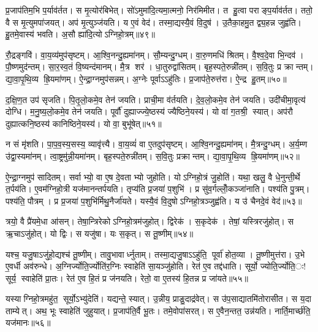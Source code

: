 प्र॒जाप॑तिम॒भि प॒र्याव॑र्तत। स मृ॒त्योर॑बिभेत्। सो॑ऽमुमा॑दि॒त्यमा॒त्मनो॒ निर॑मिमीत। त हु॒त्वा पराङ्प॒र्याव॑र्तत। ततो॒ वै स मृ॒त्युमपा॑जयत्। अप॑ मृ॒त्युञ्ज॑यति। य ए॒वं वेद॑। तस्मा॒द्यस्यै॒वं वि॒दुष॑। उ॒तैका॒हमु॒त द्व्य॒हन्न जुह्व॑ति। हु॒तमे॒वास्य॑ भवति। अ॒सौ ह्या॑दि॒त्योऽग्निहो॒त्रम्॥४९॥\anuvakamend[त॒नुवै॑ वा॒युर॒ग्निर्भ॑व॒त्यवि॑त्वा भव॒त्येकं च]

रौ॒द्रङ्गवि॑। वा॒य॒व्य॑मुप॑सृष्टम्। आ॒श्वि॒नन्दु॒ह्यमा॑नम्। सौ॒म्यन्दु॒ग्धम्। वा॒रु॒णमधि॑ श्रितम्। वै॒श्व॒दे॒वा भि॒न्दव॑। पौ॒ष्णमुद॑न्तम्। सा॒र॒स्व॒तं वि॒ष्यन्द॑मानम्। मै॒त्र शर॑। धा॒तुरुद्वा॑सितम्। बृह॒स्पते॒रुन्नी॑तम्। स॒वि॒तुः प्र क्रान्तम्। द्या॒वा॒पृ॒थि॒व्य ह्रि॒यमा॑णम्। ऐ॒न्द्रा॒ग्नमुप॑सन्नम्। अ॒ग्नेः पूर्वाऽऽहु॑तिः। प्र॒जाप॑ते॒रुत्त॑रा। ऐ॒न्द्र हु॒तम्॥५०॥\anuvakamend[उद्वा॑सित स॒प्त च॑]

द॒क्षि॒ण॒त उप॑ सृजति। पि॒तृ॒लो॒कमे॒व तेन॑ जयति। प्राची॒मा व॑र्तयति। दे॒व॒लो॒कमे॒व तेन॑ जयति। उदी॑चीमा॒वृत्य॑ दोग्धि। म॒नु॒ष्य॒लो॒कमे॒व तेन॑ जयति। पूर्वौ॑ दुह्याज्ज्ये॒ष्ठस्य॑ ज्यैष्ठिने॒यस्य॑। यो वा॑ ग॒तश्री॒ स्यात्। अप॑रौ दुह्यात्कनि॒ष्ठस्य॑ कानिष्ठिने॒यस्य॑। यो वा॒ बुभू॑षेत्॥५१॥

न सं मृ॑शति। पा॒प॒व॒स्य॒सस्य॒ व्यावृ॑त्त्यै। वा॒य॒व्यं॑ वा ए॒तदुप॑सृष्टम्। आ॒श्वि॒नन्दु॒ह्यमा॑नम्। मै॒त्रन्दु॒ग्धम्। अ॒र्य॒म्ण उ॑द्वा॒स्यमा॑नम्। त्वा॒ष्ट्रमु॑न्नी॒यमा॑नम्। बृह॒स्पते॒रुन्नी॑तम्। स॒वि॒तुः प्रक्रान्तम्। द्या॒वा॒पृ॒थि॒व्य ह्रि॒यमा॑णम्॥५२॥

ऐ॒न्द्रा॒ग्नमुप॑ सादितम्। सर्वाभ्यो॒ वा ए॒ष दे॒वताभ्यो जुहोति। योऽग्निहो॒त्रं जु॒होति॑। यथा॒ खलु॒ वै धे॒नुन्ती॒र्थे त॒र्पय॑ति। ए॒वम॑ग्निहो॒त्री यज॑मानन्तर्पयति। तृप्य॑ति प्र॒जया॑ प॒शुभि॑। प्र सु॑व॒र्गल्लोँ॒कञ्जा॑नाति। पश्य॑ति पु॒त्रम्। पश्य॑ति॒ पौत्रम्। प्र प्र॒जया॑ प॒शुभि॑र्मिथु॒नैर्जा॑यते। यस्यै॒वं वि॒दुषोऽग्निहो॒त्रञ्जुह्व॑ति। य उ॑ चैनदे॒वं वेद॑॥५३॥\anuvakamend[बुभू॑षेद्ध्रि॒यमा॑णञ्जायते॒ द्वे च॑]

त्रयो॒ वै प्रै॑यमे॒धा आ॑सन्। तेषा॒न्त्रिरेकोऽग्निहो॒त्रम॑जुहोत्। द्विरेक॑। स॒कृदेक॑। तेषां॒ यस्त्रिरजु॑होत्। स ऋ॒चाऽजु॑होत्। यो द्विः। स यजु॑षा। यः स॒कृत्। स तू॒ष्णीम्॥५४॥

यश्च॒ यजु॒षाऽजु॑हो॒द्यश्च॑ तू॒ष्णीम्। तावु॒भावार्ध्नुताम्। तस्मा॒द्यजु॒षाऽऽहु॑ति॒ पूर्वा॑ होत॒व्या। तू॒ष्णीमुत्त॑रा। उ॒भे ए॒वर्धी अव॑रुन्धे। अ॒ग्निर्ज्योति॒र्ज्योति॑र॒ग्निः स्वाहेति॑ सा॒यञ्जु॑होति। रेत॑ ए॒व तद्द॑धाति। सूर्यो॒ ज्योति॒र्ज्योति॒ः! सूर्य॒ स्वाहेति॑ प्रा॒तः। रेत॑ ए॒व हि॒तं प्र ज॑नयति। रेतो॒ वा ए॒तस्य॑ हि॒तन्न प्र जा॑यते॥५५॥

यस्याग्निहो॒त्रमहु॑त॒ सूर्यो॒ऽभ्यु॑देति॑। यद्यन्ते॒ स्यात्। उ॒न्नीय॒ प्राङु॒दाद्र॑वेत्। स उ॑प॒साद्यातमि॑तोरासीत। स य॒दा ताम्येत्। अथ॒ भूः स्वाहेति॑ जुहुयात्। प्र॒जाप॑ति॒र्वै भू॒तः। तमे॒वोपा॑सरत्। स ए॒वैन॒न्तत॒ उन्न॑यति। नार्ति॒मार्च्छ॑ति॒ यज॑मानः॥५६॥\anuvakamend[तू॒ष्णीञ्जा॑यते॒ यज॑मानः]

